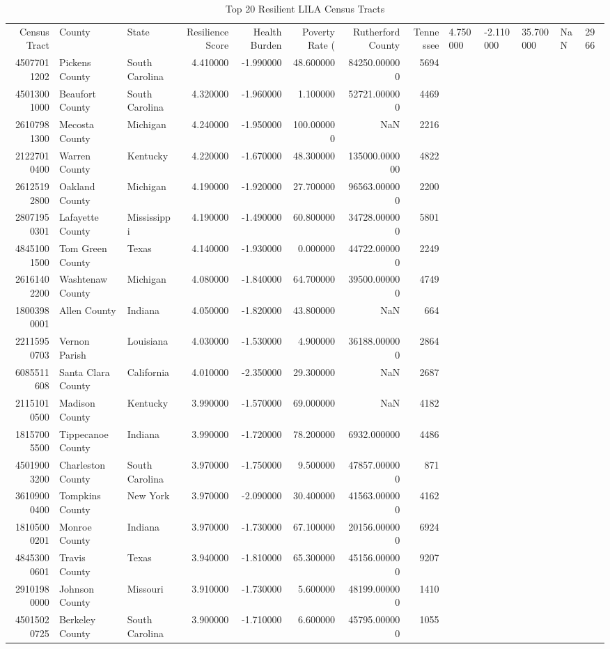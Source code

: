 \begin{table}
\caption{Top 20 Resilient LILA Census Tracts}
\begin{tabular}{rllrrrrr}
\toprule
Census Tract & County & State & Resilience Score & Health Burden & Poverty Rate (%
 & Rutherford County & Tennessee & 4.750000 & -2.110000 & 35.700000 & NaN & 2966 \\
45077011202 & Pickens County & South Carolina & 4.410000 & -1.990000 & 48.600000 & 84250.000000 & 5694 \\
45013001000 & Beaufort County & South Carolina & 4.320000 & -1.960000 & 1.100000 & 52721.000000 & 4469 \\
26107981300 & Mecosta County & Michigan & 4.240000 & -1.950000 & 100.000000 & NaN & 2216 \\
21227010400 & Warren County & Kentucky & 4.220000 & -1.670000 & 48.300000 & 135000.000000 & 4822 \\
26125192800 & Oakland County & Michigan & 4.190000 & -1.920000 & 27.700000 & 96563.000000 & 2200 \\
28071950301 & Lafayette County & Mississippi & 4.190000 & -1.490000 & 60.800000 & 34728.000000 & 5801 \\
48451001500 & Tom Green County & Texas & 4.140000 & -1.930000 & 0.000000 & 44722.000000 & 2249 \\
26161402200 & Washtenaw County & Michigan & 4.080000 & -1.840000 & 64.700000 & 39500.000000 & 4749 \\
18003980001 & Allen County & Indiana & 4.050000 & -1.820000 & 43.800000 & NaN & 664 \\
22115950703 & Vernon Parish & Louisiana & 4.030000 & -1.530000 & 4.900000 & 36188.000000 & 2864 \\
6085511608 & Santa Clara County & California & 4.010000 & -2.350000 & 29.300000 & NaN & 2687 \\
21151010500 & Madison County & Kentucky & 3.990000 & -1.570000 & 69.000000 & NaN & 4182 \\
18157005500 & Tippecanoe County & Indiana & 3.990000 & -1.720000 & 78.200000 & 6932.000000 & 4486 \\
45019003200 & Charleston County & South Carolina & 3.970000 & -1.750000 & 9.500000 & 47857.000000 & 871 \\
36109000400 & Tompkins County & New York & 3.970000 & -2.090000 & 30.400000 & 41563.000000 & 4162 \\
18105000201 & Monroe County & Indiana & 3.970000 & -1.730000 & 67.100000 & 20156.000000 & 6924 \\
48453000601 & Travis County & Texas & 3.940000 & -1.810000 & 65.300000 & 45156.000000 & 9207 \\
29101980000 & Johnson County & Missouri & 3.910000 & -1.730000 & 5.600000 & 48199.000000 & 1410 \\
45015020725 & Berkeley County & South Carolina & 3.900000 & -1.710000 & 6.600000 & 45795.000000 & 1055 \\
\bottomrule
\end{tabular}
\end{table}
